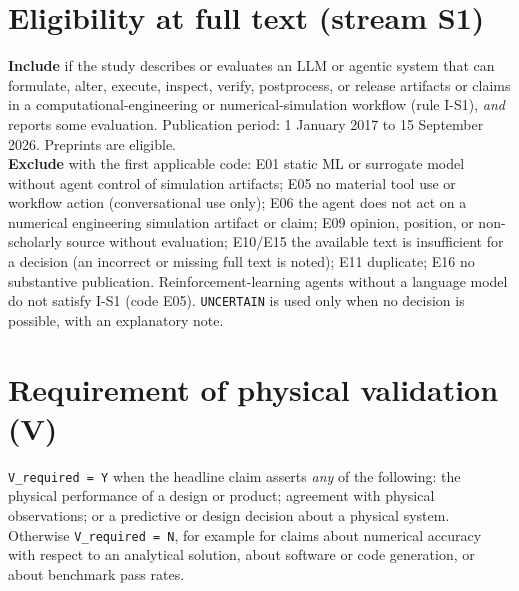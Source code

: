 \documentclass[10pt,a4paper]{article}
\begin{document}
\section{Eligibility at full text (stream S1)}
\textbf{Include} if the study describes or evaluates an LLM or agentic system that can formulate, alter, execute, inspect, verify, postprocess, or release artifacts or claims in a computational-engineering or numerical-simulation workflow (rule I-S1), \emph{and} reports some evaluation. Publication period: 1 January 2017 to 15 September 2026. Preprints are eligible.\\
\textbf{Exclude} with the first applicable code: E01 static ML or surrogate model without agent control of simulation artifacts; E05 no material tool use or workflow action (conversational use only); E06 the agent does not act on a numerical engineering simulation artifact or claim; E09 opinion, position, or non-scholarly source without evaluation; E10/E15 the available text is insufficient for a decision (an incorrect or missing full text is noted); E11 duplicate; E16 no substantive publication. Reinforcement-learning agents without a language model do not satisfy I-S1 (code E05). \texttt{UNCERTAIN} is used only when no decision is possible, with an explanatory note.

\section{Requirement of physical validation (V)}
\texttt{V\_required = Y} when the headline claim asserts \emph{any} of the following: the physical performance of a design or product; agreement with physical observations; or a predictive or design decision about a physical system. Otherwise \texttt{V\_required = N}, for example for claims about numerical accuracy with respect to an analytical solution, about software or code generation, or about benchmark pass rates.
\end{document}
